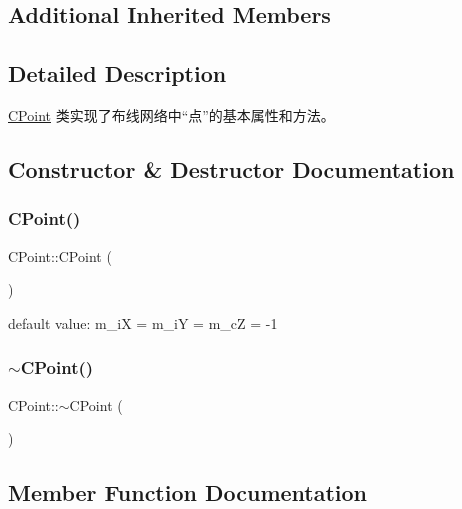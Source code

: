 \subsection*{Additional Inherited Members}


\subsection{Detailed Description}
\mbox{\hyperlink{classCPoint}{C\+Point}} 类实现了布线网络中“点”的基本属性和方法。 

\subsection{Constructor \& Destructor Documentation}
\mbox{\label{classCPoint_afce98ba89f4a9283c9d1c94571ca70f2}} 
\subsubsection{\texorpdfstring{CPoint()}{CPoint()}}
{\footnotesize\ttfamily C\+Point\+::\+C\+Point (\begin{DoxyParamCaption}{ }\end{DoxyParamCaption})}

default value\+: m\+\_\+iX = m\+\_\+iY = m\+\_\+cZ = -\/1 \mbox{\label{classCPoint_a1f368b093ec85c9ee8ec3da805aa1d47}} 
\subsubsection{\texorpdfstring{$\sim$CPoint()}{~CPoint()}}
{\footnotesize\ttfamily C\+Point\+::$\sim$\+C\+Point (\begin{DoxyParamCaption}{ }\end{DoxyParamCaption})\hspace{0.3cm}{\ttfamily [virtual]}}



\subsection{Member Function Documentation}
\mbox{\label{classCPoint_adff246311a759e9c7eaa5f5374dd3643}} 
